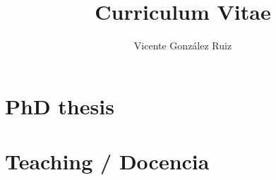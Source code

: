 \documentclass{article}
\begin{document}
\title{Curriculum Vitae}
\author{Vicente González Ruiz}


\maketitle

\renewcommand{\refname}{Journal papers / Artículos en revistas}


\renewcommand{\refname}{Conference papers / Ponencias en congresos}


\renewcommand{\refname}{Books / Libros}


\renewcommand{\refname}{Book chapters / Capítulos de libro}


\renewcommand{\refname}{Projects / Proyectos}


\renewcommand{\refname}{Contracts / Contratos}


\renewcommand{\refname}{Phd thesis supervision / Supervisión de tesis}


\section*{PhD thesis}


\section*{Teaching / Docencia}


\renewcommand{\refname}{Courses / Cursos impartidos}


\renewcommand{\refname}{Final projects supervision / Supervisión de
  proyectos final de carrera}

\end{document}
